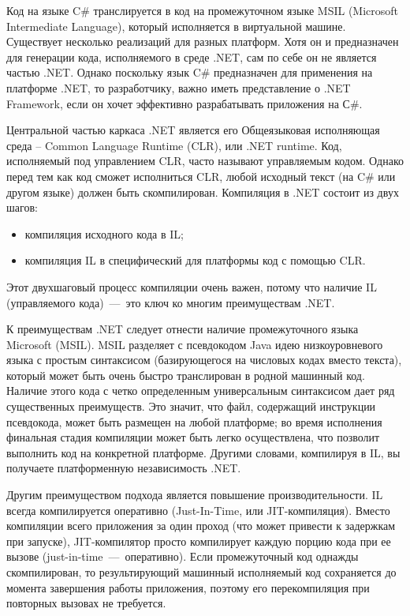 Код на языке C\# транслируется в код на промежуточном языке MSIL (Microsoft Intermediate Language), который исполняется в виртуальной машине. Существует несколько реализаций для разных платформ. Хотя он и предназначен для генерации кода, исполняемого в среде .NET, сам по себе он не является частью .NET. Однако поскольку язык C\# предназначен для применения на платформе .NET, то разработчику, важно иметь представление о .NET Framework, если он хочет эффективно разрабатывать приложения на С\#. 

Центральной частью каркаса .NET является его Общеязыковая исполняющая среда – Common Language Runtime (CLR), или .NET runtime. Код, исполняемый под управлением CLR, часто называют управляемым кодом. Однако перед тем как код сможет исполниться CLR, любой исходный текст (на C\# или другом языке) должен быть скомпилирован. Компиляция в .NET состоит из двух шагов: 
\begin{itemize}
	\item компиляция исходного кода в IL; 
	\item компиляция IL в специфический для платформы код с помощью CLR.
\end{itemize}
 
Этот двухшаговый процесс компиляции очень важен, потому что наличие IL (управляемого кода)~---~это ключ ко многим преимуществам .NET.

К преимуществам .NET следует отнести наличие промежуточного языка Microsoft (MSIL).  MSIL разделяет с псевдокодом Java идею низкоуровневого языка с простым синтаксисом (базирующегося на числовых кодах вместо текста), который может быть очень быстро транслирован в родной машинный код. Наличие этого кода с четко определенным универсальным синтаксисом дает ряд существенных преимуществ. 
Это значит, что файл, содержащий инструкции псевдокода, может быть размещен на любой платформе; во время исполнения финальная стадия компиляции может быть легко осуществлена, что позволит выполнить код на конкретной платформе. Другими словами, компилируя в IL, вы получаете платформенную независимость .NET. 

Другим преимуществом подхода является повышение производительности. IL всегда компилируется оперативно (Just-In-Time, или JIT-компиляция). Вместо компиляции всего приложения за один проход (что может привести к задержкам при запуске), JIT-компилятор просто компилирует каждую порцию кода при ее вызове (just-in-time~---~оперативно). Если промежуточный код однажды скомпилирован, то результирующий машинный исполняемый код сохраняется до момента завершения работы приложения, поэтому его перекомпиляция при повторных вызовах не требуется.
 
